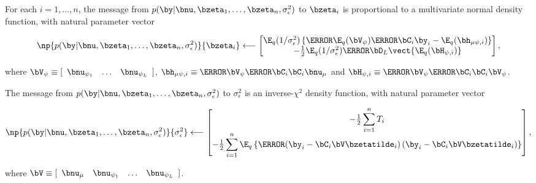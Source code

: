 \documentclass[ba]{imsart}
\numberwithin{equation}{section}
\theoremstyle{plain}
\def\sigsqeps{\sigma^2_{\epsilon}}
\def\numu{\bnu_\mu}
\def\Vpsi{\bV_\psi}
\newcommand\nupsi[1]{\bnu_{\psi_{#1}}}
\newcommand\hmupsi[1]{\bh_{\mu \psi, #1}}
\newcommand\Hpsi[1]{\bH_{\psi, #1}}
\begin{document}
For each $i = 1, \dots, n$, the message from $p (\by | \bnu, \bzeta_1, \dots, \bzeta_n, \sigsqeps)$ to $\bzeta_i$
is proportional to a multivariate normal density function, with natural parameter vector

\begin{equation}
	\np{p (\by | \bnu, \bzeta_1, \dots, \bzeta_n, \sigsqeps)}{\bzeta_i}
		\longleftarrow
			\begin{bmatrix}
				\E_q (1/\sigsqeps) \left\{
					\T{\E_q (\Vpsi)} \T{\bC_i} \by_i - \E_q (\hmupsi{i})
				\right\} \\
				-\frac12 \E_q (1/\sigsqeps) \T{\bD_L} \vect \{ \E_q (\Hpsi{i}) \}
			\end{bmatrix},
\label{np_lik_zeta}
\end{equation}

\noindent where $ \Vpsi \equiv [\begin{array}{ccc} \nupsi{1} & \dots & \nupsi{L} \end{array}]$,
$\hmupsi{i} \equiv \T{\Vpsi} \T{\bC_i} \bC_i \numu$ and $\Hpsi{i} \equiv \T{\Vpsi} \T{\bC_i} \bC_i \Vpsi$.

The message from $p (\by | \bnu, \bzeta_1, \dots, \bzeta_n, \sigsqeps)$ to $\sigsqeps$
is an inverse-$\chi^2$ density function, with natural parameter vector

\begin{equation}
	\np{p (\by | \bnu, \bzeta_1, \dots, \bzeta_n, \sigsqeps)}{\sigsqeps}
		\longleftarrow
			\begin{bmatrix}
				-\frac12 \displaystyle\sum_{i=1}^n T_i \\
				-\frac12 \displaystyle\sum_{i=1}^n \E_q \left\{ \T{\left(
					\by_i - \bC_i \bV \bzetatilde_i
				\right)} \left(
					\by_i - \bC_i \bV \bzetatilde_i
				\right) \right\}
			\end{bmatrix},
\label{np_lik_sigsqeps}
\end{equation}

\noindent where $\bV \equiv [\begin{array}{cccc} \numu & \nupsi{1} & \dots & \nupsi{L} \end{array}]$.

\end{document}
